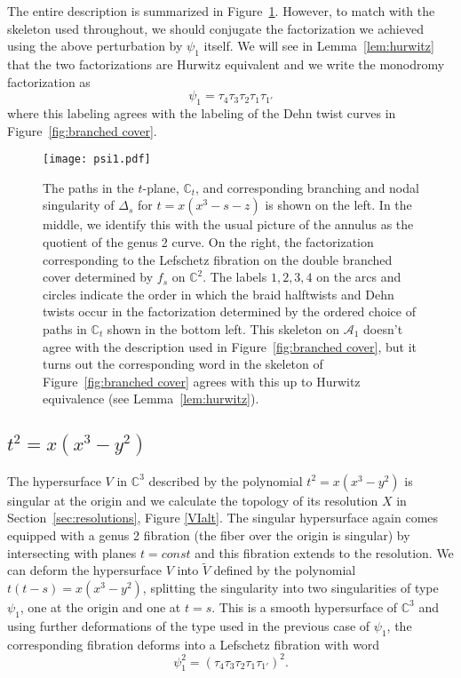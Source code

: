 \documentclass[11pt,letterpaper,reqno]{amsart}
\theoremstyle{remark}
\newcommand{\CC}{{\mathbb C}}
\def \A {\mathcal{A}}
\begin{document}
The entire description is summarized in Figure~\ref{fig:psi1}. However, to match with the skeleton used throughout, we should conjugate the factorization we achieved using the above perturbation by $\psi_1$ itself. We will see in Lemma~\ref{lem:hurwitz} that the two factorizations are Hurwitz equivalent and we write the monodromy factorization as $$\psi_1 = \tau_4 \tau_3 \tau_2 \tau_1 \tau_{1'}$$ where this labeling agrees with the labeling of the Dehn twist curves in Figure~\ref{fig:branched cover}.

\begin{figure}
    \centering
    \texttt{[image: psi1.pdf]}
    \caption{The paths in the $t$-plane, $\CC_t$, and corresponding branching and nodal singularity of $\Delta_s$ for $t = x(x^3-s-z)$ is shown on the left. In the middle, we identify this with the usual picture of the annulus as the quotient of the genus 2 curve. On the right, the factorization corresponding to the Lefschetz fibration on the double branched cover determined by $f_s$ on $\CC^2$. The labels $1, 2, 3, 4$ on the arcs and circles indicate the order in which the braid halftwists and Dehn twists occur in the factorization determined by the ordered choice of paths in $\CC_t$ shown in the bottom left. This skeleton on $\A_1$ doesn't agree with the description used in Figure~\ref{fig:branched cover}, but it turns out the corresponding word in the skeleton of Figure~\ref{fig:branched cover} agrees with this up to Hurwitz equivalence (see Lemma~\ref{lem:hurwitz}).}
    \label{fig:psi1}
\end{figure}







\subsection{\texorpdfstring{{\boldmath $t^2 = x(x^3-y^2)$}}{psi2}}
\label{sec:psi2}

The hypersurface $V$ in $\CC^3$ described by the polynomial $t^2 = x(x^3-y^2)$ is singular at the origin and we calculate the topology of its resolution $X$ in Section~\ref{sec:resolutions}, Figure \ref{VIalt}. The singular hypersurface again comes equipped with a genus 2 fibration (the fiber over the origin is singular) by intersecting with planes $t=\mathit{const}$ and this fibration extends to the resolution. We can deform the hypersurface $V$ into $\tilde{V}$ defined by the polynomial $t(t-s) = x(x^3-y^2)$, splitting the singularity into two singularities of type $\psi_1$, one at the origin and one at $t=s$. This is a smooth hypersurface of $\CC^3$ and using further deformations of the type used in the previous case of $\psi_1$, the corresponding fibration deforms into a Lefschetz fibration with word $$\psi_1^2 = \left(\tau_4 \tau_3 \tau_2 \tau_1 \tau_{1'}\right)^2.$$
\end{document}
